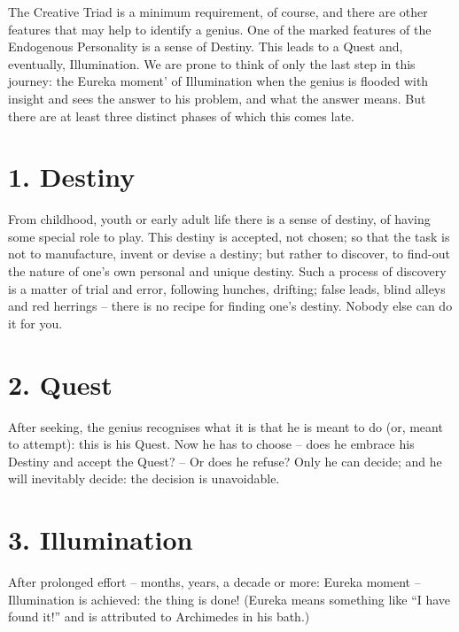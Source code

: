 \documentclass[
]{book}
\begin{document}
The Creative Triad is a minimum requirement, of course, and there are other features that may help to identify a genius. One of the marked features of the Endogenous Personality is a sense of Destiny. This leads to a Quest and, eventually, Illumination. We are prone to think of only the last step in this journey: the Eureka moment' of Illumination when the genius is flooded with insight and sees the answer to his problem, and what the answer means. But there are at least three distinct phases of which this comes late.

\hypertarget{destiny}{%
\section*{1. Destiny}\label{destiny}}

From childhood, youth or early adult life there is a sense of destiny, of having some special role to play. This destiny is accepted, not chosen; so that the task is not to manufacture, invent or devise a destiny; but rather to discover, to find-out the nature of one's own personal and unique destiny. Such a process of discovery is a matter of trial and error, following hunches, drifting; false leads, blind alleys and red herrings -- there is no recipe for finding one's destiny. Nobody else can do it for you.

\hypertarget{quest}{%
\section*{2. Quest}\label{quest}}

After seeking, the genius recognises what it is that he is meant to do (or, meant to attempt): this is his Quest. Now he has to choose -- does he embrace his Destiny and accept the Quest? -- Or does he refuse? Only he can decide; and he will inevitably decide: the decision is unavoidable.

\hypertarget{illumination}{%
\section*{3. Illumination}\label{illumination}}

After prolonged effort -- months, years, a decade or more: Eureka moment -- Illumination is achieved: the thing is done! (Eureka means something like ``I have found it!'' and is attributed to Archimedes in his bath.)
\end{document}
